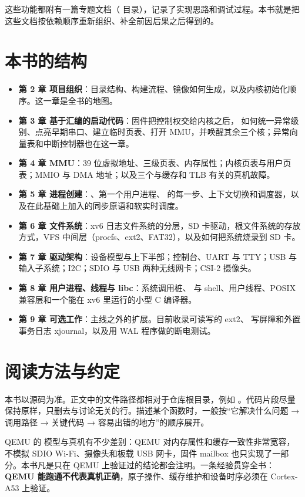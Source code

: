 这些功能都附有一篇专题文档（ 目录），记录了实现思路和调试过程。本书就是把这些文档按依赖顺序重新组织、补全前因后果之后得到的。

\section{本书的结构}

\begin{itemize}
  \item \textbf{第 2 章 项目组织}：目录结构、构建流程、镜像如何生成，以及内核初始化顺序。这一章是全书的地图。
  \item \textbf{第 3 章 基于汇编的启动代码}：固件把控制权交给内核之后， 如何统一异常级别、点亮早期串口、建立临时页表、打开 MMU，并唤醒其余三个核；异常向量表和中断控制器也在这一章。
  \item \textbf{第 4 章 MMU}：39 位虚拟地址、三级页表、内存属性；内核页表与用户页表；MMIO 与 DMA 地址；以及三个与缓存和 TLB 有关的真机故障。
  \item \textbf{第 5 章 进程创建}：、第一个用户进程、 的每一步、上下文切换和调度器，以及在此基础上加入的同步原语和软实时调度。
  \item \textbf{第 6 章 文件系统}：xv6 日志文件系统的分层，SD 卡驱动，根文件系统的存放方式，VFS 中间层（procfs、ext2、FAT32），以及如何把系统烧录到 SD 卡。
  \item \textbf{第 7 章 驱动架构}：设备模型与上下半部；控制台、UART 与 TTY；USB 与输入子系统；I2C；SDIO 与 USB 两种无线网卡；CSI-2 摄像头。
  \item \textbf{第 8 章 用户进程、线程与 libc}：系统调用桩、 与 shell、用户线程、POSIX 兼容层和一个能在 xv6 里运行的小型 C 编译器。
  \item \textbf{第 9 章 可选工作}：主线之外的扩展。目前收录可读写的 ext2、 写屏障和外置事务日志 xjournal，以及用 WAL 程序做的断电测试。
\end{itemize}

\section{阅读方法与约定}

本书以源码为准。正文中的文件路径都相对于仓库根目录，例如 。代码片段尽量保持原样，只删去与讨论无关的行。描述某个函数时，一般按“它解决什么问题 → 调用路径 → 关键代码 → 容易出错的地方”的顺序展开。

\begin{note}
  QEMU 的  模型与真机有不少差别：QEMU 对内存属性和缓存一致性非常宽容，不模拟 SDIO Wi-Fi、摄像头和板载 USB 网卡，固件 mailbox 也只实现了一部分。本书凡是只在 QEMU 上验证过的结论都会注明。一条经验贯穿全书：\textbf{QEMU 能跑通不代表真机正确}，原子操作、缓存维护和设备时序必须在 Cortex-A53 上验证。
\end{note}

